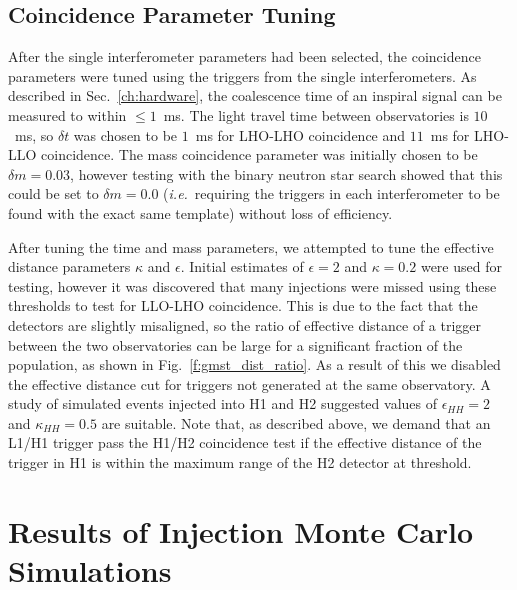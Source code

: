 \subsection{Coincidence Parameter Tuning}
\label{ss:coinc_tuning}

After the single interferometer parameters had been selected, the coincidence
parameters were tuned using the triggers from the single interferometers.  As
described in Sec.~\ref{ch:hardware}, the coalescence time of an inspiral
signal can be measured to within $\le1$~ms. The light travel time between
observatories is $10$~ms, so $\delta t$ was chosen to be $1$~ms for LHO-LHO
coincidence and $11$~ms for LHO-LLO coincidence. The mass coincidence
parameter was initially chosen to be $\delta m = 0.03$, however testing with
the binary neutron star search showed that this could be set to $\delta m =
0.0$ ({\it i.e.}\ requiring the triggers in each interferometer to be found
with the exact same template) without loss of efficiency.

After tuning the time and mass parameters, we attempted to tune the effective
distance parameters $\kappa$ and $\epsilon$. Initial estimates of $\epsilon =
2$ and $\kappa = 0.2$ were used for testing, however it was discovered that
many injections were missed using these thresholds to test for LLO-LHO
coincidence. This is due to the fact that the detectors are slightly
misaligned, so the ratio of effective distance of a trigger between the two
observatories can be large for a significant fraction of the population, as
shown in Fig.~\ref{f:gmst_dist_ratio}. As a result of this we disabled the
effective distance cut for triggers not generated at the same observatory.
A study of simulated events injected into H1 and H2 suggested values
of $\epsilon_{HH} = 2$ and $\kappa_{HH} = 0.5$ are suitable. Note
that, as described above, we demand that an L1/H1 trigger pass the H1/H2
coincidence test if the effective distance of the trigger in H1 is within the
maximum range of the H2 detector at threshold.

\section{Results of Injection Monte Carlo Simulations}
\label{s:monte}

